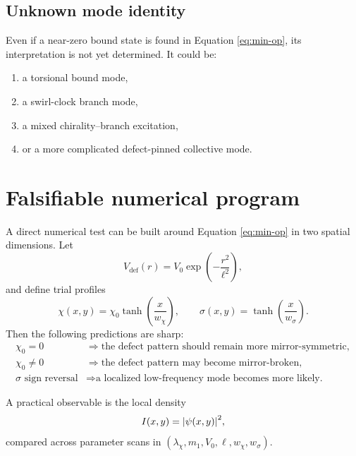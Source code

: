 \documentclass[11pt]{article}
\begin{document}
        \subsection{Unknown mode identity}
            Even if a near-zero bound state is found in Equation \eqref{eq:min-op}, its interpretation is not yet determined. It could be:
            \begin{enumerate}[label=(\alph*)]
    \item a torsional bound mode,
    \item a swirl-clock branch mode,
    \item a mixed chirality--branch excitation,
    \item or a more complicated defect-pinned collective mode.
            \end{enumerate}

    \section{Falsifiable numerical program}
        A direct numerical test can be built around Equation \eqref{eq:min-op} in two spatial dimensions. Let
        \begin{equation}
            V_{\mathrm{def}}(r)=V_0\exp\!\left(-\frac{r^2}{\ell^2}\right),
        \end{equation}
        and define trial profiles
        \begin{equation}
            \chi(x,y)=\chi_0\tanh\!\left(\frac{x}{w_\chi}\right),
            \qquad
            \sigma(x,y)=\tanh\!\left(\frac{x}{w_\sigma}\right).
        \end{equation}
        Then the following predictions are sharp:
        \begin{align}
            \chi_0=0 &\Longrightarrow \text{the defect pattern should remain more mirror-symmetric},\\
            \chi_0\neq 0 &\Longrightarrow \text{the defect pattern may become mirror-broken},\\
            \sigma \text{ sign reversal} &\Longrightarrow \text{a localized low-frequency mode becomes more likely.}
        \end{align}

        A practical observable is the local density
        \begin{equation}
            I(x,y)=\abs{\psi(x,y)}^2,
        \end{equation}
        compared across parameter scans in $(\lambda_\chi, m_1, V_0, \ell, w_\chi, w_\sigma)$.
\end{document}

